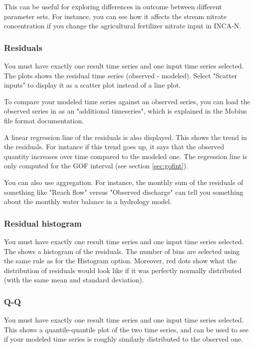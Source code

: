 \documentclass[11pt]{article}
\theoremstyle{definition}
\begin{document}
This can be useful for exploring differences in outcome between different parameter sets. For instance, you can see how it affects the stream nitrate concentration if you change the agricultural fertilizer nitrate input in INCA-N.

\subsubsection{Residuals}

You must have exactly one result time series and one input time series selected. The plots shows the residual time series (observed - modeled). Select "Scatter inputs" to display it as a scatter plot instead of a line plot.

To compare your modeled time series against an observed series, you can load the observed series in as an "additional timeseries", which is explained in the Mobius file format documentation.

A linear regression line of the residuals is also displayed. This shows the trend in the residuals. For instance if this trend goes up, it says that the observed quantity increases over time compared to the modeled one. The regression line is only computed for the GOF interval (see section \ref{sec:gofint}).

You can also use aggregation. For instance, the monthly sum of the residuals of something like "Reach flow" versus "Observed discharge" can tell you something about the monthly water balance in a hydrology model.

\subsubsection{Residual histogram}

You must have exactly one result time series and one input time series selected. The shows a histogram of the residuals. The number of bins are selected using the same rule as for the Histogram option. Moreover, red dots show what the distribution of residuals would look like if it was perfectly normally distributed (with the same mean and standard deviation).

\subsubsection{Q-Q}

You must have exactly one result time series and one input time series selected. This shows a quantile-quantile plot of the two time series, and can be used to see if your modeled time series is roughly similarly distributed to the observed one.
\end{document}
